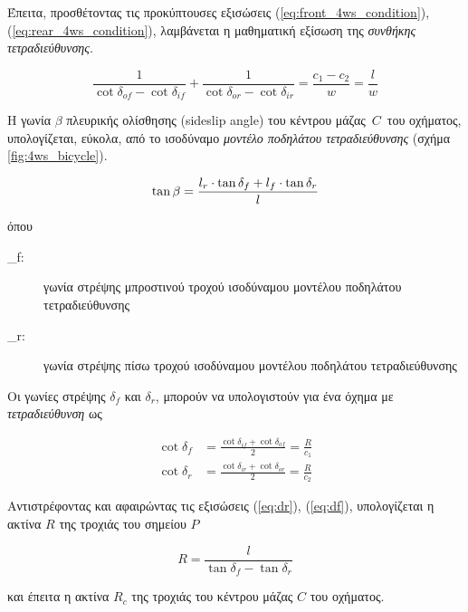 {\noindent
Έπειτα, προσθέτοντας τις προκύπτουσες εξισώσεις (\ref{eq:front_4ws_condition}), (\ref{eq:rear_4ws_condition}), λαμβάνεται η μαθηματική εξίσωση της \textit{συνθήκης τετραδιεύθυνσης}.

\begin{equation}
	\frac{1}{\cot{\delta_{of}} - \cot{\delta_{if}}} + \frac{1}{\cot{\delta_{or}} - \cot{\delta_{ir}}} = \frac{c_1 - c_2}{w} = \frac{l}{w}
	\label{eq:4ws_condition}
\end{equation}


\bigskip\bigskip
H γωνία $\beta$ πλευρικής ολίσθησης (sideslip angle) \cite{automated_odometry} του κέντρου μάζας $\,C\,$ του οχήματος, υπολογίζεται, εύκολα, από το ισοδύναμο \textit{μοντέλο ποδηλάτου τετραδιεύθυνσης} (σχήμα \ref{fig:4ws_bicycle}).

\begin{equation}
	\tan{\beta} = \frac{l_r \cdot \tan{\delta_f} + l_f \cdot \tan{\delta_r}}{l}
	\label{eq:neg_4ws_beta}\\
\end{equation} 

\noindent
όπου
\begin{description}
	\item[\delta_f:] γωνία στρέψης μπροστινού τροχού ισοδύναμου μοντέλου ποδηλάτου τετραδιεύθυνσης
	\item[\delta_r:] γωνία στρέψης πίσω τροχού ισοδύναμου μοντέλου ποδηλάτου τετραδιεύθυνσης
\end{description}

\bigskip
Οι γωνίες στρέψης $\delta_f$ και $\delta_r$, μπορούν να υπολογιστούν για ένα όχημα με \textit{τετραδιεύθυνση} ως

\begin{align}
	\cot{\delta_f} &= \frac{\cot{\delta_{if}} + \cot{\delta_{of}}}{2} = \frac{R}{c_1}
	\label{eq:df}\\
	\cot{\delta_r} &= \frac{\cot{\delta_{ir}} + \cot{\delta_{or}}}{2} = \frac{R}{c_2}
	\label{eq:dr}
\end{align}

\bigskip
Αντιστρέφοντας και αφαιρώντας τις εξισώσεις (\ref{eq:dr}), (\ref{eq:df}), υπολογίζεται η ακτίνα $R$ της τροχιάς του σημείου $P$

\begin{equation}
	R = \frac{l}{\tan{\delta_f} - \tan{\delta_r}}
	\label{eq:pos_p_turning_radius}
\end{equation}


\bigskip
\noindent
και έπειτα η ακτίνα $R_c$ της τροχιάς του κέντρου μάζας $C$ του οχήματος.

}
